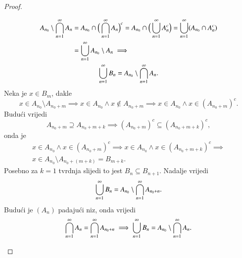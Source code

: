 \begin{proof}
\begin{enumerate}[label={(\roman*)}]
        \begin{equation*}
            \begin{gathered}
                \begin{aligned}
                    A_{n_0} \setminus \bigcap\limits_{n=1}^{\infty} A_n &= A_{n_0} \cap \Big( \bigcap\limits_{n=1}^{\infty} A_n \Big)^c = A_{n_0} \cap \Big( \bigcup\limits_{n = 1}^{\infty} A_n^c \Big) = \bigcup\limits_{n = 1}^{\infty} (A_{n_0} \cap A_n^c)\\
                    &= \bigcup\limits_{n = 1}^{\infty} A_{n_0} \setminus A_n \implies
                \end{aligned}\\
                \bigcup\limits_{n=1}^{\infty} B_n = A_{n_0} \setminus \bigcap\limits_{n=1}^{\infty} A_n.
            \end{gathered}
        \end{equation*}
            Neka je $x \in B_m$, dakle
            \begin{equation*}
                    x \in A_{n_0} \setminus A_{n_0+m} \implies x \in A_{n_0}
                    \land x \notin A_{n_0+m} \implies x \in A_{n_0} \land x \in (A_{n_0+m})^c.
            \end{equation*}
            Budu\' ci vrijedi
            \begin{equation*}
                A_{n_0+m} \supseteq A_{n_0+m+k} \implies (A_{n_0+m})^c
            \subseteq (A_{n_0+m+k})^c,
            \end{equation*}
            onda je
            \begin{equation*}
                \begin{gathered}
                    x \in A_{n_0} \land x \in (A_{n_0+m})^c \implies x \in A_{n_0} \land x \in (A_{n_0+m+k})^c \implies\\
                    x \in A_{n_0} \setminus A_{n_0+(m+k)} = B_{m+k}.
                \end{gathered}
            \end{equation*}
            Posebno za $k=1$ tvrdnja slijedi to jest $B_n \subseteq B_{n+1}$.
            Nadalje vrijedi
            \begin{equation*}
                \bigcup\limits_{n=1}^{\infty}
            B_n = A_{n_0} \setminus \bigcap\limits_{n=1}^{\infty} A_{n_0+n}.
            \end{equation*}
            Budu\' ci je $(A_n)$ padaju\' ci niz, onda vrijedi
            \begin{equation*}
                \presjek{n=1}{\infty} A_n = \presjek{n=1}{\infty} A_{n_0+n} \implies \unija{n=1}{\infty} B_n = A_{n_0} \setminus \presjek{n=1}{\infty} A_n.

\end{equation*}
\end{enumerate}
\end{proof}
